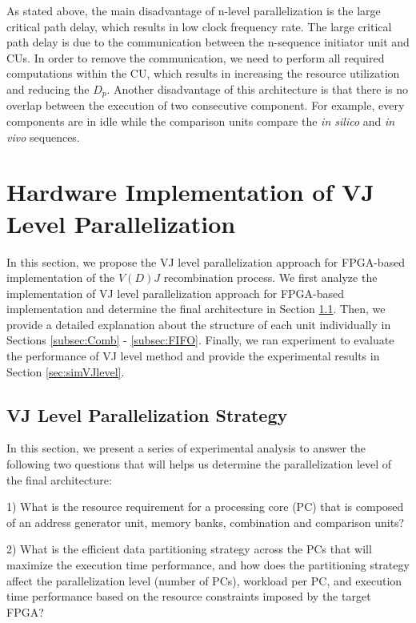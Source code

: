 As stated above, the main disadvantage of n-level parallelization is the large critical path delay, which results in low clock frequency rate. The large critical path delay is due to the communication between the n-sequence initiator unit and CUs. In order to remove the communication, we need to perform all required computations within the CU, which results in increasing the resource utilization and reducing the $D_p$. Another disadvantage of this architecture is that there is no overlap between the execution of two consecutive component. For example, every components are in idle while the comparison units compare the \emph{in silico} and \emph{in vivo} sequences. 



\section{Hardware Implementation of VJ Level Parallelization} \label{sec:VJ level}
In this section, we propose the VJ level parallelization approach for FPGA-based implementation of the $V(D)J$ recombination process. We first analyze the implementation of VJ level parallelization approach for FPGA-based implementation and determine the final architecture in Section \ref{subsec:parallel VJ Level}. Then, we provide a detailed explanation about the structure of each unit individually in Sections \ref{subsec:Comb} - \ref{subsec:FIFO}. Finally, we ran experiment to evaluate the performance of VJ level method and provide the experimental results in Section \ref{sec:simVJlevel}.

\subsection{VJ Level Parallelization Strategy}\label{subsec:parallel VJ Level}
In this section, we present a series of experimental analysis to answer the following two questions that will helps us determine the parallelization level of the final architecture: 

1) What is the resource requirement for a processing core (PC) that is composed of an address generator unit, memory banks, combination and comparison units?

2) What is the efficient data partitioning strategy across the PCs that will maximize the execution time performance, and how does the partitioning strategy affect the parallelization level (number of PCs), workload per PC, and execution time performance based on the resource constraints imposed by the target FPGA? 

